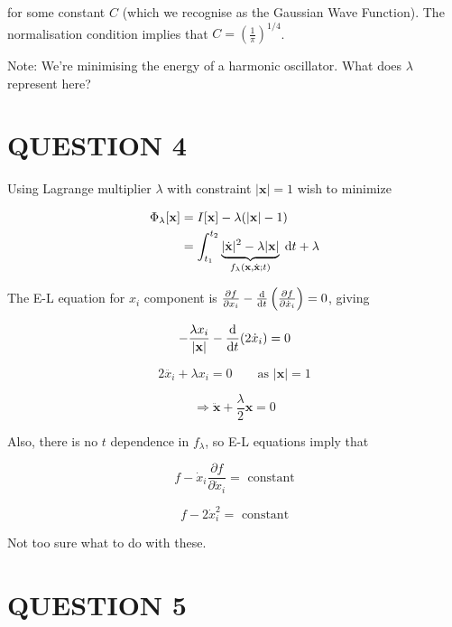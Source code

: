 \documentclass[a4paper]{article}
\begin{document}
for some constant $ C $ (which we recognise as the Gaussian Wave Function).
The normalisation condition implies that $ C = \left(  \frac{1}{\pi} \right)^{1/4}  $. 

Note: We're minimising the energy of a harmonic oscillator. What does $ \lambda $ represent here?





\section{QUESTION 4}
                                                 
Using Lagrange multiplier $ \lambda $ with constraint $ | \mathbf{x} | = 1 $ wish to minimize
                                                 
\begin{align*}
\Phi_{\lambda}[\mathbf{x}] & = I[\mathbf{x}] - \lambda(  | \mathbf{x} | - 1 ) \\
& = \int_{t_{1}}^{t_{2}} \underbrace{| \dot{\mathbf{x}} |^{2} - \lambda | \mathbf{x} |}_{f_{\lambda}(\mathbf{x},\dot{\mathbf{x}} ; t )  } \; \mathrm{d} t + \lambda
\end{align*}   

The E-L equation for $ x_{i} $ component is $ \frac{\partial f }{\partial x_{i}} - \frac{\mathrm{d} }{\mathrm{d} t} \left(  \frac{\partial f}{\partial \dot{x}_{i}} \right) = 0   $, giving

\[ - \frac{\lambda x_{i}}{| \mathbf{x} |}  - \frac{\mathrm{d} }{\mathrm{d} t} (  2 \dot{x}_{i} ) = 0 \]     

\[ 2 \ddot{x_{i}} + \lambda x_{i} = 0  \qquad \text{as } | \mathbf{x} | = 1 \]        

\[ \Rightarrow \ddot{\mathbf{x}}  + \frac{\lambda}{2} \mathbf{x} = 0 \]    

Also, there is no $ t $ dependence in $ f_{\lambda} $, so E-L equations imply that

\[ f - \dot{x}_{i} \frac{\partial f }{\partial \dot{x}_{i}} = \text{ constant} \]    

\[ f - 2  \dot{x}_{i}^{2} = \text{ constant} \]

Not too sure what to do with these.                         




\section{QUESTION 5}
\end{document}
